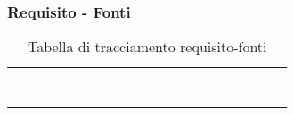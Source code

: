 \subsubsection{Requisito - Fonti}
\renewcommand{\arraystretch}{1.5}
\begin{center}
\begin{longtable}{C{2cm} | C{5cm} C{0.2cm} C{2cm} | C{5cm}}
		\textcolor{white}{\textbf{Requisito}} & 
		\textcolor{white}{\textbf{Fonti}}&
		 & 
		\textcolor{white}{\textbf{Requisito}} & 
		\textcolor{white}{\textbf{Fonti}}\\
		\endfirsthead
	    \\
	    \endfoot
	    \caption{Tabella di tracciamento requisito-fonti}
	    \endlastfoot



\end{longtable}
\end{center}
